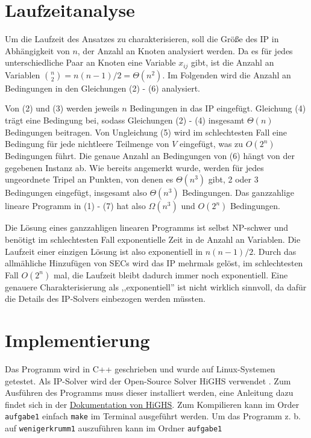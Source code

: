\documentclass[a4paper, 10pt, ngerman]{article}
\begin{document}
\section{Laufzeitanalyse}

Um die Laufzeit des Ansatzes zu charakterisieren, soll die Größe des IP in Abhängigkeit von $n$, der Anzahl an Knoten analysiert werden. Da es für jedes unterschiedliche Paar an Knoten eine Variable $x_{ij}$ gibt, ist die Anzahl an Variablen $\binom n 2 = n(n - 1) / 2 = \Theta(n^2)$. Im Folgenden wird die Anzahl an Bedingungen in den Gleichungen (2) - (6) analysiert.

Von (2) und (3) werden jeweils $n$ Bedingungen in das IP eingefügt. Gleichung (4) trägt eine Bedingung bei, sodass Gleichungen (2) - (4) insgesamt $\Theta(n)$ Bedingungen beitragen. Von Ungleichung (5) wird im schlechtesten Fall eine Bedingung für jede nichtleere Teilmenge von $V$ eingefügt, was zu $O(2^n)$ Bedingungen führt. Die genaue Anzahl an Bedingungen von (6) hängt von der gegebenen Instanz ab. Wie bereits angemerkt wurde, werden für jedes ungeordnete Tripel an Punkten, von denen es $\Theta(n^3)$ gibt, 2 oder 3 Bedingungen eingefügt, insgesamt also $\Theta(n^3)$ Bedingungen. Das ganzzahlige lineare Programm in (1) - (7) hat also $\Omega(n^3)$ und $O(2^n)$ Bedingungen.

Die Lösung eines ganzzahligen linearen Programms ist selbst NP-schwer und benötigt im schlechtesten Fall exponentielle Zeit in de Anzahl an Variablen. Die Laufzeit einer einzigen Lösung ist also exponentiell in $n(n-1)/2$. Durch das allmähliche Hinzufügen von SECs wird das IP mehrmals gelöst, im schlechtesten Fall $O(2^n)$ mal, die Laufzeit bleibt dadurch immer noch exponentiell. Eine genauere Charakterisierung als ,,exponentiell'' ist nicht wirklich sinnvoll, da dafür die Details des IP-Solvers einbezogen werden müssten.

\section{Implementierung}

Das Programm wird in C++ geschrieben und wurde auf Linux-Systemen getestet. Als IP-Solver wird der Open-Source Solver HiGHS verwendet \cite{highs}. Zum Ausführen des Programms muss dieser installiert werden, eine Anleitung dazu findet sich in der \href{https://ergo-code.github.io/HiGHS/cpp/get-started.html}{Dokumentation von HiGHS}. Zum Kompilieren kann im Order \verb|aufgabe1| einfach \verb|make| im Terminal ausgeführt werden. Um das Programm z. b. auf \verb|wenigerkrumm1| auszuführen kann im Ordner \verb|aufgabe1|
\end{document}
